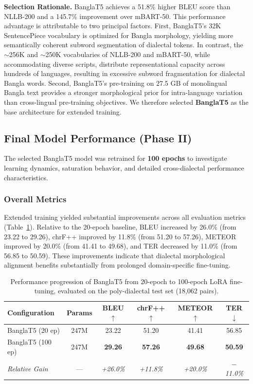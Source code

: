 \documentclass[12pt,a4paper]{article}
\begin{document}
\textbf{Selection Rationale.} BanglaT5 achieves a 51.8\% higher BLEU score than NLLB-200 and a 145.7\% improvement over mBART-50. This performance advantage is attributable to two principal factors. First, BanglaT5's 32K SentencePiece vocabulary is optimized for Bangla morphology, yielding more semantically coherent subword segmentation of dialectal tokens. In contrast, the $\sim$256K and $\sim$250K vocabularies of NLLB-200 and mBART-50, while accommodating diverse scripts, distribute representational capacity across hundreds of languages, resulting in excessive subword fragmentation for dialectal Bangla words. Second, BanglaT5's pre-training on 27.5 GB of monolingual Bangla text provides a stronger morphological prior for intra-language variation than cross-lingual pre-training objectives. We therefore selected \textbf{BanglaT5} as the base architecture for extended training.

\subsection{Final Model Performance (Phase II)}
The selected BanglaT5 model was retrained for \textbf{100 epochs} to investigate learning dynamics, saturation behavior, and detailed cross-dialectal performance characteristics.

\subsubsection{Overall Metrics}
Extended training yielded substantial improvements across all evaluation metrics (Table~\ref{tab:model_results_final}). Relative to the 20-epoch baseline, BLEU increased by 26.0\% (from 23.22 to 29.26), chrF++ improved by 11.8\% (from 51.20 to 57.26), METEOR improved by 20.0\% (from 41.41 to 49.68), and TER decreased by 11.0\% (from 56.85 to 50.59). These improvements indicate that dialectal morphological alignment benefits substantially from prolonged domain-specific fine-tuning.

\begin{table}[htbp]
\centering
\caption{Performance progression of BanglaT5 from 20-epoch to 100-epoch LoRA fine-tuning, evaluated on the poly-dialectal test set (18,062 pairs).}
\label{tab:model_results_final}
\begin{tabular}{l c c c c c}
\toprule
\textbf{Configuration} & \textbf{Params} & \textbf{BLEU $\uparrow$} & \textbf{chrF++ $\uparrow$} & \textbf{METEOR $\uparrow$} & \textbf{TER $\downarrow$} \\
\midrule
BanglaT5 (20 ep) & 247M & 23.22 & 51.20 & 41.41 & 56.85 \\
BanglaT5 (100 ep) & 247M & \textbf{29.26} & \textbf{57.26} & \textbf{49.68} & \textbf{50.59} \\
\midrule
\textit{Relative Gain} & --- & \textit{+26.0\%} & \textit{+11.8\%} & \textit{+20.0\%} & \textit{$-$11.0\%} \\
\bottomrule
\end{tabular}
\end{table}
\end{document}
